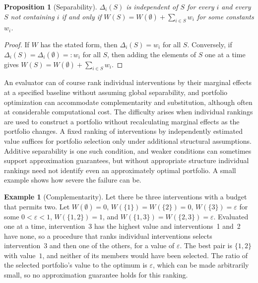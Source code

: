 \documentclass[11pt]{article}
\newtheorem{proposition}{Proposition}
\theoremstyle{definition}
\newtheorem{example}{Example}
\theoremstyle{remark}
\begin{document}
\begin{proposition}[Separability]
\label{prop:sep}
$\Delta_i(S)$ is independent of $S$ for every $i$ and every $S$ not containing $i$ if and only if $W(S)=W(\emptyset)+\sum_{i\in S}w_i$ for some constants $w_i$.
\end{proposition}

\begin{proof}
If $W$ has the stated form, then $\Delta_i(S)=w_i$ for all $S$. Conversely, if $\Delta_i(S)=\Delta_i(\emptyset)=:w_i$ for all $S$, then adding the elements of $S$ one at a time gives $W(S)=W(\emptyset)+\sum_{i\in S}w_i$.
\end{proof}

An evaluator can of course rank individual interventions by their marginal effects at a specified baseline without assuming global separability, and portfolio optimization can accommodate complementarity and substitution, although often at considerable computational cost. The difficulty arises when individual rankings are used to construct a portfolio without recalculating marginal effects as the portfolio changes. A fixed ranking of interventions by independently estimated value suffices for portfolio selection only under additional structural assumptions. Additive separability is one such condition, and weaker conditions can sometimes support approximation guarantees, but without appropriate structure individual rankings need not identify even an approximately optimal portfolio. A small example shows how severe the failure can be.

\begin{example}[Complementarity]
\label{ex:comp}
Let there be three interventions with a budget that permits two. Let $W(\emptyset)=0$, $W(\{1\})=W(\{2\})=0$, $W(\{3\})=\varepsilon$ for some $0<\varepsilon<1$, $W(\{1,2\})=1$, and $W(\{1,3\})=W(\{2,3\})=\varepsilon$. Evaluated one at a time, intervention~3 has the highest value and interventions~1 and~2 have none, so a procedure that ranks individual interventions selects intervention~3 and then one of the others, for a value of $\varepsilon$. The best pair is $\{1,2\}$ with value~$1$, and neither of its members would have been selected. The ratio of the selected portfolio's value to the optimum is $\varepsilon$, which can be made arbitrarily small, so no approximation guarantee holds for this ranking.
\end{example}
\end{document}
